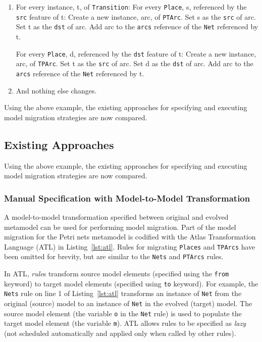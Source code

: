 \begin{enumerate}
	\item For every instance, t, of \texttt{Transition}: 
	\subitem For every \texttt{Place}, s, referenced by the \texttt{src} feature of t: 
	\subsubitem Create a new instance, arc, of \texttt{PTArc}. 
	\subsubitem Set s as the \texttt{src} of arc. 
	\subsubitem Set t as the \texttt{dst} of arc. 
	\subsubitem Add arc to the \texttt{arcs} reference of the \texttt{Net} referenced by t.
	
	\subitem For every \texttt{Place}, d, referenced by the \texttt{dst} feature of t: 
	\subsubitem Create a new instance, arc, of \texttt{TPArc}. 
	\subsubitem Set t as the \texttt{src} of arc. 
	\subsubitem Set d as the \texttt{dst} of arc. 
	\subsubitem Add arc to the \texttt{arcs} reference of the \texttt{Net} referenced by t.
	
	\item And nothing else changes.
\end{enumerate}

Using the above example, the existing approaches for specifying and executing model migration strategies are now compared.


\subsection{Existing Approaches}
\label{subsec:existing_migration_languages}
Using the above example, the existing approaches for specifying and executing model migration strategies are now compared.

\subsubsection{Manual Specification with Model-to-Model Transformation}
\label{subsubsec:m2m}

A model-to-model transformation specified between original and evolved metamodel can be used for performing model migration. Part of the model migration for the Petri nets metamodel is codified with the Atlas Transformation Language (ATL) \cite{jouault05transforming} in Listing~\ref{lst:atl}. Rules for migrating \texttt{Places} and \texttt{TPArcs} have been omitted for brevity, but are similar to the \texttt{Nets} and \texttt{PTArcs} rules.

In ATL, \emph{rule}s transform source model elements (specified using the \texttt{fr\-om} keyword) to target model elements (specified using \texttt{to} keyword). For example, the \texttt{Nets} rule on line 1 of Listing~\ref{lst:atl} transforms an instance of \texttt{Net} from the original (source) model to an instance of \texttt{Net} in the evolved (target) model. The source model element (the variable \texttt{o} in the \texttt{Net} rule) is used to populate the target model element (the variable \texttt{m}). ATL allows rules to be specified as \emph{lazy} (not scheduled automatically and applied only when called by other rules).

